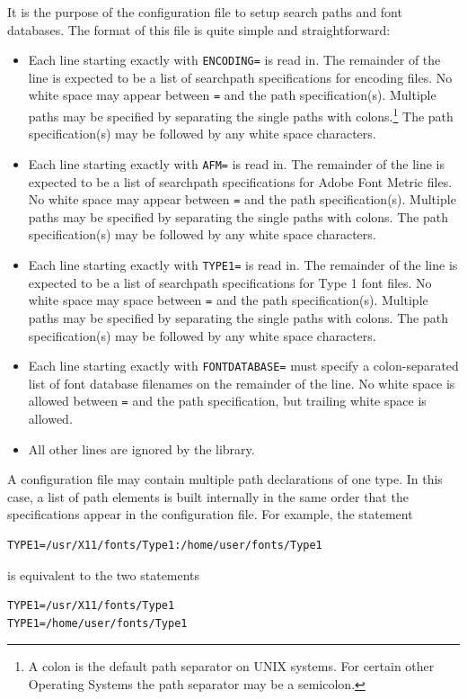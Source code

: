 It is the purpose of the configuration file to setup search paths and font
databases. The format of this file is quite simple and straightforward:
\begin{itemize}
\item Each line starting exactly with \verb+ENCODING=+ is read in. The
  remainder of the line is expected to be a list of searchpath
  specifications for encoding files. No white space may appear
  between \verb+=+ and the path specification(s).
  Multiple paths may be specified by separating
  the single paths with colons.\footnote{A colon is the default path separator
    on UNIX systems. For certain other Operating Systems the path separator
    may be a semicolon.} The path specification(s) may be
  followed by any white space characters.
\item Each line starting exactly with \verb+AFM=+ is read in. The
  remainder of the line is expected to be a list of searchpath
  specifications for Adobe Font Metric files. No white space may
  appear between \verb+=+ and the path specification(s). 
  Multiple paths may be specified by separating 
  the single paths with colons. The path specification(s) may be
  followed by any white space characters.
\item Each line starting exactly with \verb+TYPE1=+ is read in. The
  remainder of the line is expected to be a list of searchpath
  specifications for Type 1 font files. No white space may
  space between \verb+=+ and the path specification(s). 
  Multiple paths may be specified by separating
  the single paths with colons. The path specification(s) may be
  followed by any white space characters.
\item Each line starting exactly with \verb+FONTDATABASE=+ must specify a
  colon-separated list of font database filenames on the remainder of the
  line. No white space is allowed between \verb+=+ and the path specification,
  but trailing white space is allowed.
\item All other lines are ignored by the library. 
\end{itemize}

A configuration file may contain multiple path declarations of one type. In this
case, a list of path elements is built internally in the same order that the
specifications appear in the configuration file. For example, the statement 
\begin{verbatim}
TYPE1=/usr/X11/fonts/Type1:/home/user/fonts/Type1
\end{verbatim}
is equivalent to the two statements
\begin{verbatim}
TYPE1=/usr/X11/fonts/Type1
TYPE1=/home/user/fonts/Type1
\end{verbatim}


